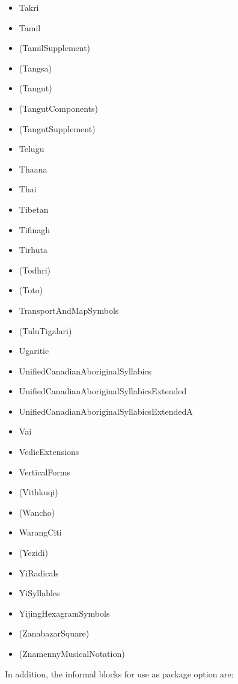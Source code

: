 \documentclass{article}
\newenvironment{itemlist}{%
  \begin{itemize}
  \setlength{\itemsep}{0pt}
  \setlength{\parsep}{0pt}
  \setlength{\topsep}{0pt}
  \setlength{\partopsep}{0pt}
  \setlength{\parskip}{0pt}
  \setlength{\labelsep}{5pt}}%
{
  \end{itemize}}
\begin{document}
\begin{multicols*}{2}
\begin{itemlist}
        \item Takri
        \item Tamil
        \item (TamilSupplement)
        \item (Tangsa)
        \item (Tangut)
        \item (TangutComponents)
        \item (TangutSupplement)
        \item Telugu
        \item Thaana
        \item Thai
        \item Tibetan
        \item Tifinagh
        \item Tirhuta
        \item (Todhri)
        \item (Toto)
        \item TransportAndMapSymbols
        \item (TuluTigalari)
        \item Ugaritic
        \item UnifiedCanadianAboriginalSyllabics
        \item UnifiedCanadianAboriginalSyllabicsExtended
        \item UnifiedCanadianAboriginalSyllabicsExtendedA
        \item Vai
        \item VedicExtensions
        \item VerticalForms
        \item (Vithkuqi)
        \item (Wancho)
        \item WarangCiti
        \item (Yezidi)
        \item YiRadicals
        \item YiSyllables
        \item YijingHexagramSymbols
        \item (ZanabazarSquare)
        \item (ZnamennyMusicalNotation)
      \end{itemlist}
    \end{multicols*}

    In addition, the informal blocks for use as package option are:
\end{document}
